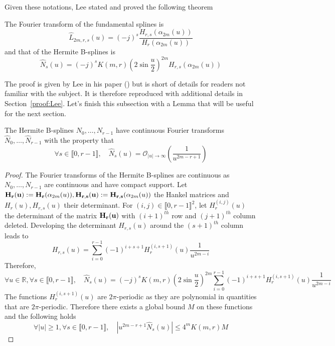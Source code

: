 Given these notations, Lee stated and proved the following theorem
\begin{thm}\label{thm:Lee}
  The Fourier transform of the fundamental splines is
  \begin{equation}\label{eq:Lee1}
    \hat{L}_{2m,r,s}(u) = {(-j)}^{s} \frac{H_{r,s}(\alpha_{2m}(u))}{H_r(\alpha_{2m}(u))}
  \end{equation}
  and that of the Hermite B-splines is
  \begin{equation}\label{eq:Lee2}
    \hat{N}_s(u) = {(-j)}^s K(m,r) {\left(2 \sin \frac{u}{2} \right)}^{2m} H_{r,s}(\alpha_{2m}(u))
  \end{equation}
\end{thm}

The proof is given by Lee in his paper (\cite{Lee76b}) but is short of details for readers not familiar with the 
subject. It is therefore reproduced with additional details in Section~\ref{proof:Lee}. Let's finish this subsection 
with a Lemma that will be useful for the next section.

\begin{lem}\label{lem:Ns}
  The Hermite B-splines $N_0, \ldots, N_{r-1}$ have continuous Fourier transforms $\hat{N}_0, \ldots, \hat{N}_{r-1}$ 
  with the property that
  \begin{equation*}
    \forall s \in \llbracket0,r-1\rrbracket, \quad \hat{N}_s(u) = \mathcal{O}_{|u| \to \infty}\left( 
    \frac{1}{u^{2m-r+1}}\right)
  \end{equation*}
\end{lem}

\begin{proof}
  The Fourier transforms of the Hermite B-splines are continuous as $N_0, \ldots, N_{r-1}$ are continuous and have 
  compact support. Let $\mathbf{H_r(u)} := \mathbf{H_r}(\alpha_{2m}(u)), \mathbf{H_{r,s}(u)} := \mathbf{H_{r,s}}(\alpha_{2m}(u)) 
  $ the Hankel matrices and $H_r(u), H_{r,s}(u)$ their determinant.  For $(i,j) \in {\llbracket0,r-1\rrbracket}^2$, let 
  $H_r^{(i,j)}(u)$ the determinant of the matrix $\mathbf{H_r(u)}$ with $(i+1)^{th}$ row  and $(j+1)^{th}$ column deleted.  
  Developing the determinant $H_{r,s}(u)$ around the $(s+1)^{th}$ column leads to
  \begin{equation*}
    H_{r,s}(u)  = \sum_{i=0}^{r-1} (-1)^{i+s+1} H_{r}^{(i, s+1)}(u) \frac{1}{u^{2m-i}}
  \end{equation*}
  Therefore, 
  \begin{equation*}
    \forall u \in \mathbb{R}, \forall s \in \llbracket0,r-1\rrbracket, \quad \hat{N}_s(u) = {(-j)}^s K(m,r) {\left(2 
    \sin \frac{u}{2} \right)}^{2m} \sum_{i=0}^{r-1} (-1)^{i+s+1} H_{r}^{(i, s+1)}(u) \frac{1}{u^{2m-i}}
  \end{equation*}
  The functions $H_{r}^{(i, s+1)}(u)$ are $2\pi$-periodic as they are polynomial in quantities that are $2\pi$-periodic.  
  Therefore there exists a global bound $M$ on these functions and the following holds
  \begin{equation*}
    \forall |u| \geq 1, \forall s \in \llbracket0,r-1\rrbracket, \quad |u^{2m-r+1}\hat{N}_s(u)| \leq 4^m K(m,r) M 
  \end{equation*}
\end{proof}

